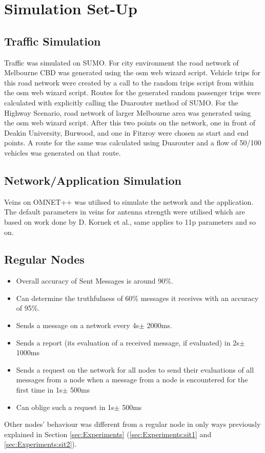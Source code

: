 \documentclass[journal]{IEEEtran}
\begin{document}
\appendices
\setcounter{figure}{0}
\renewcommand\thefigure{\Alph{section}.\arabic{figure}}
\section{Simulation Set-Up}
\label{apdx:simSetUp}
\subsection{Traffic Simulation}
Traffic was simulated on SUMO. For city environment the road network of Melbourne CBD was generated using the osm web wizard script. Vehicle trips for this road network were created by a call to the random trips script from within the osm web wizard script. Routes for the generated random passenger trips were calculated with explicitly calling the Duarouter method of SUMO. For the Highway Scenario, road network of larger Melbourne area was generated using the osm web wizard script. After this two points on the network, one in front of Deakin University, Burwood, and one in Fitzroy were chosen as start and end points. A route for the same was calculated using Duarouter and a flow of 50/100 vehicles was generated on that route.
\subsection{Network/Application Simulation}
Veins on OMNET++ was utilised to simulate the network and the application. The default parameters in veins for antenna strength were utilised which are based on work done by D. Kornek et al.\cite{c:AntennaOmnetpp}, same applies to 11p parameters and so on.
\subsection{Regular Nodes }
\begin{itemize}
	\item Overall accuracy of Sent Messages is around 90\%.
	\item Can determine the truthfulness of 60\% messages it receives with an accuracy of 95\%.
	\item Sends a message on a network every 4s$ \pm $ 2000ms.
	\item Sends a report (its evaluation of a received message, if evaluated) in 2s$ \pm $ 1000ms
	\item Sends a request on the network for all nodes to send their evaluations of all messages from a node when a message from a node is encountered for the first time in 1s$ \pm $ 500ms
	\item Can oblige such a request in 1s$ \pm $ 500ms
\end{itemize}
Other nodes' behaviour was different from a regular node in only ways previously explained in Section \ref{sec:Experiments} (\ref{sec:Experiments:sit1} and \ref{sec:Experiments:sit2}).
\end{document}
